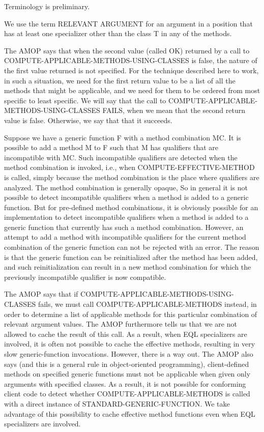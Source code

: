 Terminology is preliminary.

We use the term RELEVANT ARGUMENT for an argument in a position that
has at least one specializer other than the class T in any of the
methods.

The AMOP says that when the second value (called OK) returned by a
call to COMPUTE-APPLICABLE-METHODS-USING-CLASSES is false, the nature
of the first value returned is not specified.  For the technique
described here to work, in such a situation, we need for the first
return value to be a list of all the methods that might be applicable,
and we need for them to be ordered from most specific to least
specific.  We will say that the call to
COMPUTE-APPLICABLE-METHODS-USING-CLASSES FAILS, when we mean that the
second return value is false.  Otherwise, we say that that it
succeeds.

Suppose we have a generic function F with a method combination MC.  It
is possible to add a method M to F such that M has qualifiers that are
incompatible with MC.  Such incompatible qualifiers are detected when
the method combination is invoked, i.e., when COMPUTE-EFFECTIVE-METHOD
is called, simply because the method combination is the place where
qualifiers are analyzed.  The method combination is generally opaque,
So in general it is not possible to detect incompatible qualifiers
when a method is added to a generic function.  But for pre-defined
method combinations, it is obviously possible for an implementation to
detect incompatible qualifiers when a method is added to a generic
function that currently has such a method combination.  However, an
attempt to add a method with incompatible qualifiers for the current
method combination of the generic function can not be rejected with an
error.  The reason is that the generic function can be reinitialized
after the method has been added, and such reinitialization can result
in a new method combination for which the previously incompatible
qualifier is now compatible.

The AMOP says that if COMPUTE-APPLICABLE-METHODS-USING-CLASSES fails,
we must call COMPUTE-APPLICABLE-METHODS instead, in order to determine
a list of applicable methods for this particular combination of
relevant argument values.  The AMOP furthermore tells us that we are
not allowed to cache the result of this call.  As a result, when EQL
specializers are involved, it is often not possible to cache the
effective methods, resulting in very slow generic-function
invocations.  However, there is a way out.  The AMOP also says (and
this is a general rule in object-oriented programming), client-defined
methods on specified generic functions must not be applicable when
given only arguments with specified classes.  As a result, it is not
possible for conforming client code to detect whether
COMPUTE-APPLICABLE-METHODS is called with a direct instance of
STANDARD-GENERIC-FUNCTION.  We take advantage of this possibility to
cache effective method functions even when EQL specializers are
involved.

